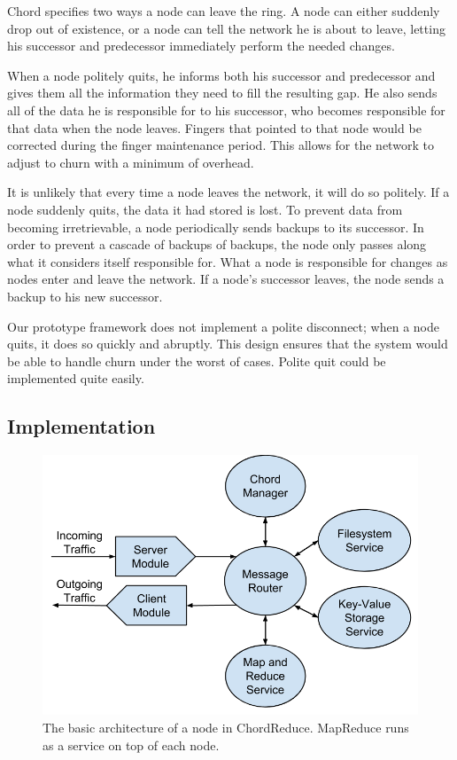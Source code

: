 Chord specifies two ways a node can leave the ring.  A node can either suddenly drop out of existence, or a node can tell the network he is about to leave, letting his successor and predecessor immediately perform the needed changes.

When a node politely quits, he informs both his successor and predecessor and gives them all the information they need to fill the resulting gap. He also sends all of the data he is responsible for to his successor, who becomes responsible for that data when the node leaves.  Fingers that pointed to that node would be corrected during the finger maintenance period.  This allows for the network to adjust to churn with a minimum of overhead.

It is unlikely that every time a node leaves the network, it will do so politely.  If a node suddenly quits, the data it had stored is lost. To prevent data from becoming irretrievable, a node periodically sends backups to its successor.  In order to prevent a cascade of backups of backups, the node only passes along what it considers itself responsible for.  What a node is responsible for changes as nodes enter and leave the network.  If a node's successor leaves, the node sends a backup to his new successor. 

Our prototype framework does not implement a polite disconnect;  when a node quits, it does so quickly and abruptly.  This design ensures that the  system would be able to handle churn under the worst of cases.  Polite quit could be implemented quite easily.


\subsection{Implementation}

\begin{figure}
	\centering
	\includegraphics[width=0.55\linewidth]{figs/crArch}
	\caption[ChordReduce architecture]{The basic architecture of a node in ChordReduce.  MapReduce runs as a service on top of each node.}
	\label{fig:crArch}
\end{figure}


